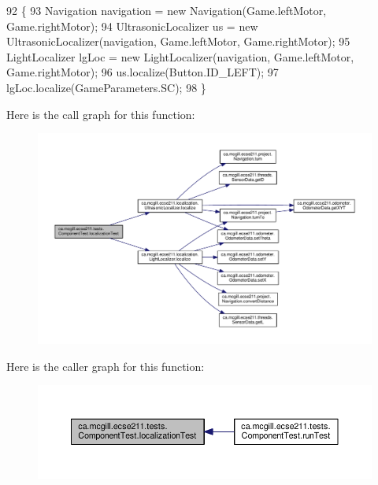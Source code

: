 \begin{DoxyCode}
92                                                                   \{
93     Navigation navigation = \textcolor{keyword}{new} Navigation(Game.leftMotor, Game.rightMotor);
94     UltrasonicLocalizer us = \textcolor{keyword}{new} UltrasonicLocalizer(navigation, Game.leftMotor, Game.rightMotor);
95     LightLocalizer lgLoc = \textcolor{keyword}{new} LightLocalizer(navigation, Game.leftMotor, Game.rightMotor);
96     us.localize(Button.ID\_LEFT);
97     lgLoc.localize(GameParameters.SC);
98   \}
\end{DoxyCode}
Here is the call graph for this function\+:
\nopagebreak
\begin{figure}[H]
\begin{center}
\leavevmode
\includegraphics[width=350pt]{enumca_1_1mcgill_1_1ecse211_1_1tests_1_1_component_test_ad11712dd74c5c64e84cd71186a59a087_cgraph}
\end{center}
\end{figure}
Here is the caller graph for this function\+:
\nopagebreak
\begin{figure}[H]
\begin{center}
\leavevmode
\includegraphics[width=350pt]{enumca_1_1mcgill_1_1ecse211_1_1tests_1_1_component_test_ad11712dd74c5c64e84cd71186a59a087_icgraph}
\end{center}
\end{figure}
\mbox{\label{enumca_1_1mcgill_1_1ecse211_1_1tests_1_1_component_test_aa40592bb550b3526402faddbc0d890c7}} 
